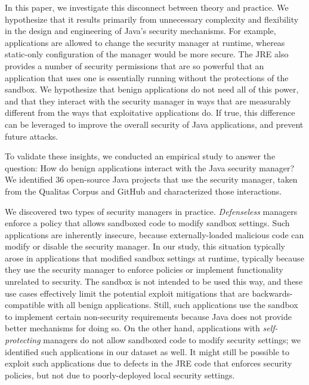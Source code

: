 \documentclass{sig-alternate}
\begin{document}
In this paper, we investigate this disconnect between theory and practice.  We
hypothesize that it results primarily from unnecessary complexity and flexibility
in the design and engineering of Java's security mechanisms.  For example,
applications are allowed to change the security manager at runtime, whereas 
static-only configuration of the manager would be more secure. The JRE also
provides a number of security permissions that are so powerful that an application
that uses one is essentially running without the protections of the sandbox. We 
hypothesize that benign applications do not need all of this power, and that
they interact with the security manager in ways
that are measurably different from the ways that exploitative applications do.  
If true, this difference can be leveraged to improve the overall security of
Java applications, and prevent future attacks.

To validate these insights, we conducted an empirical study
to answer the question: How do benign
applications interact with the Java security manager?  We identified 36
open-source Java projects that use the security manager, taken from the Qualitas
Corpus \cite{QualitasCorpus:APSEC:2010} and GitHub and characterized
those interactions.

We discovered two types of security managers in
practice. \emph{Defenseless} managers enforce a policy that allows sandboxed code
to modify sandbox settings. Such applications
are inherently insecure, because externally-loaded malicious code can
modify or disable the security manager. In our study, this situation typically
arose in applications that modified sandbox settings at runtime, typically because
they use the security manager to enforce policies or implement functionality unrelated to security.
The sandbox is not intended to be used this way, and these use cases
effectively limit the potential exploit mitigations that are
backwards-compatible with all benign applications. Still, such applications use the
sandbox to implement certain non-security requirements
because Java does not provide better mechanisms for doing so.  
On the other hand, applications with \emph{self-protecting} managers do not allow sandboxed code to modify
security settings; we identified such applications in our dataset as well.
It might still be possible to exploit
such applications due to defects in the JRE code that enforces security
policies, but not due to poorly-deployed local security settings.
\end{document}
